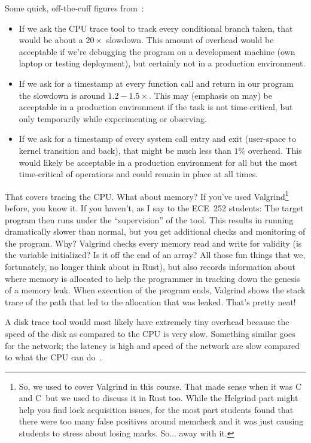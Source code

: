 \documentclass[a4paper]{report}
\newcommand{\CPP}{C\nolinebreak\hspace{-.05em}\raisebox{.4ex}{\tiny\bf +}\nolinebreak\hspace{-.10em}\raisebox{.4ex}{\tiny\bf +}}
\def\CPP{{C\nolinebreak[4]\hspace{-.05em}\raisebox{.4ex}{\tiny\bf ++}}}
\begin{document}
Some quick, off-the-cuff figures from~\cite{usd}:
\begin{itemize}
	\item If we ask the CPU trace tool to track every conditional branch taken, that would be about a $20\times$ slowdown. This amount of overhead would be acceptable if we're debugging the program on a development machine (own laptop or testing deployment), but certainly not in a production environment.
	\item If we ask for a timestamp at every function call and return in our program the slowdown is around $1.2-1.5\times$. This may (emphasis on may) be acceptable in a production environment if the task is not time-critical, but only temporarily while experimenting or observing.
	\item If we ask for a timestamp of every system call entry and exit (user-space to kernel transition and back), that might be much less than $1\%$ overhead. This would likely be acceptable in a production environment for all but the most time-critical of operations and could remain in place at all times.
\end{itemize}

That covers tracing the CPU. What about memory? If you've used Valgrind\footnote{So, we used to cover Valgrind in this course. That made sense when it was C and \CPP~but we used to discuss it in Rust too. While the Helgrind part might help you find lock acquisition issues, for the most part students found that there were too many false positives around memcheck and it was just causing students to stress about losing marks. So... away with it.} before, you know it. If you haven't, as I say to the ECE~252 students: The target program then runs under the ``supervision'' of the tool. This results in running dramatically slower than normal, but you get additional checks and monitoring of the program. Why? Valgrind checks every memory read and write for validity (is the variable initialized? Is it off the end of an array? All those fun things that we, fortunately, no longer think about in Rust), but also records information about where memory is allocated to help the programmer in tracking down the genesis of a memory leak. When execution of the program ends, Valgrind shows the stack trace of the path that led to the allocation that was leaked. That's pretty neat!

A disk trace tool would most likely have extremely tiny overhead because the speed of the disk as compared to the CPU is very slow. Something similar goes for the network; the latency is high and speed of the network are slow compared to what the CPU can do~\cite{usd}. 
\end{document}
